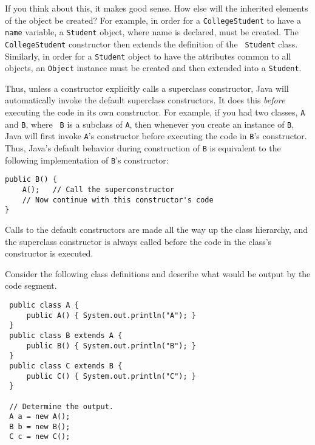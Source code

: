 If you think about this, it makes good sense. How else will the
inherited elements of the object be created? For example, in order for
a {\tt CollegeStudent} to have a {\tt name} variable, a {\tt Student}
object, where name is declared, must be created. The {\tt
CollegeStudent} constructor then extends the definition of the {\tt
Student} class.  Similarly, in order for a {\tt Student} object to
have the attributes common to all objects, an {\tt Object} instance
must be created and then extended into a {\tt Student}.

Thus, unless a constructor explicitly calls a superclass constructor,
Java will automatically invoke the default superclass constructors.
It does this {\em before} executing the code in its own constructor.
For example, if you had two classes, {\tt A} and {\tt B}, where {\tt
B} is a subclass of {\tt A}, then whenever you create an instance of
{\tt B}, Java will first invoke {\tt A}'s constructor before executing
the code in {\tt B}'s constructor.  Thus, Java's default behavior
during construction of {\tt B} is equivalent to the following
implementation of {\tt B}'s constructor:

\begin{jjjlisting}
\begin{lstlisting}
public B() {
    A();   // Call the superconstructor 
    // Now continue with this constructor's code
}
\end{lstlisting}
\end{jjjlisting}

\noindent Calls to the default constructors are made all the way
up the class hierarchy, and the superclass constructor is always
called before the code in the class's constructor is executed.

\label{self-study-exercises}
\begin{SSTUDY}

\item  Consider the following class definitions and describe what would
be output by the code segment.

\begin{jjjlisting}
\begin{lstlisting}
 public class A {
     public A() { System.out.println("A"); }
 }
 public class B extends A {
     public B() { System.out.println("B"); }
 }
 public class C extends B {
     public C() { System.out.println("C"); }
 }

 // Determine the output.
 A a = new A();
 B b = new B();
 C c = new C();
\end{lstlisting}
\end{jjjlisting}

\end{SSTUDY}

